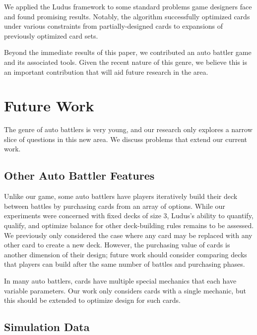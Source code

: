 \documentclass[letterpaper]{article} %
\begin{document}
We applied the {\sc Ludus} framework to some standard problems game designers face and found promising results. Notably, the algorithm successfully optimized cards under various constraints from partially-designed cards to expansions of %
previously optimized card sets.

Beyond the immediate results of this paper, we contributed an auto battler game and its associated tools. %
Given the recent nature of this genre, we believe this is an important contribution that will aid future research in the area.

\section{Future Work} \label{sec:futurework}
The genre of auto battlers is very young, and our research only explores a narrow slice of questions in this new area. We discuss problems that extend our current work.

\subsection{Other Auto Battler Features}


Unlike our game, some auto battlers have
players iteratively build their deck between battles by purchasing
cards from an array of options. While our experiments were concerned with fixed decks of size 3, 
{\sc Ludus}'s ability to quantify, qualify, and optimize balance for other deck-building rules %
remains to be assessed. We previously only considered
the case where any card may be replaced with any other card to create a new deck. However, 
the purchasing value of cards is another dimension of their design; %
future work should consider comparing decks
that players can build after the same number of battles and purchasing phases.


In many auto battlers, cards have multiple special mechanics that each have variable parameters.
Our work only considers cards with a single mechanic, but this should be extended to optimize design for such cards.


\subsection{Simulation Data}
\end{document}
